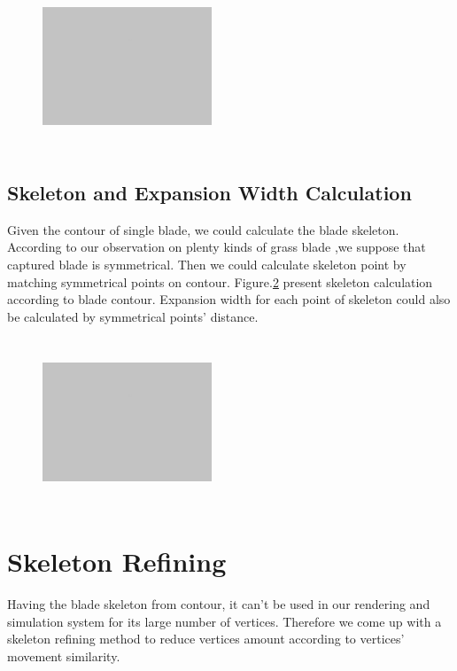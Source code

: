 \documentclass[10pt,journal,compsoc]{IEEEtran}
\begin{document}
\begin{figure}
    \centering
    \includegraphics[width=0.45\textwidth,height=5cm]{figs/test2.jpg}
    \label{fig:partition}
\end{figure}

\subsection{Skeleton and Expansion Width Calculation}
Given the contour of single blade, we could calculate the blade skeleton. According to our observation on plenty kinds of grass blade ,we suppose that captured blade is symmetrical. Then we could calculate skeleton point by matching symmetrical points on contour. Figure.\ref{fig:skeleton} present skeleton calculation according to blade contour. Expansion width for each point of skeleton could also be calculated by symmetrical points' distance.

\begin{figure}
    \centering
    \includegraphics[width=0.45\textwidth,height=5cm]{figs/test2.jpg}
    \label{fig:skeleton}
\end{figure}

\section{Skeleton Refining}\label{sec:Refining}
Having the blade skeleton from contour, it can't be used in our rendering and simulation system for its large number of vertices. Therefore we come up with a skeleton refining method to reduce vertices amount according to vertices' movement similarity.\\
\end{document}
